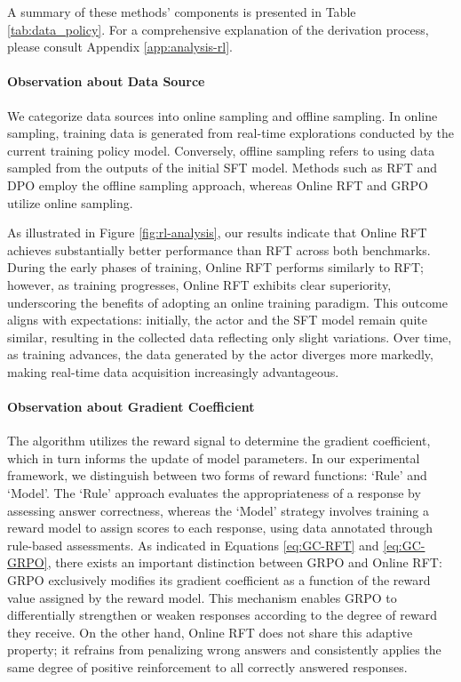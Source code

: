 \begin{itemize}[topsep=0pt]
\begin{itemize}[topsep=0pt]
A summary of these methods' components is presented in Table \ref{tab:data_policy}. For a comprehensive explanation of the derivation process, please consult Appendix \ref{app:analysis-rl}.

\paragraph{Observation about Data Source} We categorize data sources into online sampling and offline sampling. In online sampling, training data is generated from real-time explorations conducted by the current training policy model. Conversely, offline sampling refers to using data sampled from the outputs of the initial SFT model. Methods such as RFT and DPO employ the offline sampling approach, whereas Online RFT and GRPO utilize online sampling.

As illustrated in Figure \ref{fig:rl-analysis}, our results indicate that Online RFT achieves substantially better performance than RFT across both benchmarks. During the early phases of training, Online RFT performs similarly to RFT; however, as training progresses, Online RFT exhibits clear superiority, underscoring the benefits of adopting an online training paradigm. This outcome aligns with expectations: initially, the actor and the SFT model remain quite similar, resulting in the collected data reflecting only slight variations. Over time, as training advances, the data generated by the actor diverges more markedly, making real-time data acquisition increasingly advantageous.

\paragraph{Observation about Gradient Coefficient} The algorithm utilizes the reward signal to determine the gradient coefficient, which in turn informs the update of model parameters. In our experimental framework, we distinguish between two forms of reward functions: `Rule' and `Model'. The `Rule' approach evaluates the appropriateness of a response by assessing answer correctness, whereas the `Model' strategy involves training a reward model to assign scores to each response, using data annotated through rule-based assessments. As indicated in Equations \ref{eq:GC-RFT} and \ref{eq:GC-GRPO}, there exists an important distinction between GRPO and Online RFT: GRPO exclusively modifies its gradient coefficient as a function of the reward value assigned by the reward model. This mechanism enables GRPO to differentially strengthen or weaken responses according to the degree of reward they receive. On the other hand, Online RFT does not share this adaptive property; it refrains from penalizing wrong answers and consistently applies the same degree of positive reinforcement to all correctly answered responses.


\end{itemize}
\end{itemize}
